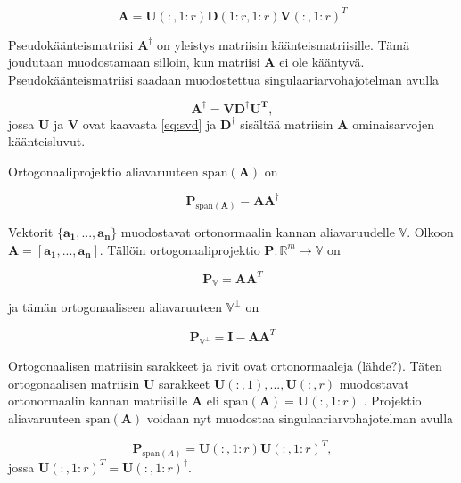 \begin{equation}
    \mathbf{A} = \mathbf{U}(:,1:r)\mathbf{D}(1:r,1:r)\mathbf{V}(:,1:r)^T
    \label{eq:2}
\end{equation}


Pseudokäänteismatriisi $\mathbf{A^{\dagger}}$ on yleistys matriisin käänteismatriisille. Tämä joudutaan muodostamaan silloin, kun matriisi $\mathbf{A}$ ei ole kääntyvä. Pseudokäänteismatriisi saadaan muodostettua singulaariarvohajotelman avulla

\begin{equation}
    \mathbf{A^{\dagger} = VD^{\dagger}U^T},
\end{equation}
jossa \textbf{U} ja \textbf{V} ovat kaavasta \ref{eq:svd} ja $\mathbf{D}^{\dagger}$ sisältää matriisin \textbf{A} ominaisarvojen käänteisluvut.

Ortogonaaliprojektio aliavaruuteen $\text{span}(\mathbf{A})$ on 

\begin{equation}
    \mathbf{P}_{\text{span}(\mathbf{A})}= \mathbf{AA}^{\dagger}
\end{equation}

Vektorit $\{\mathbf{a_1,...,a_n}\}$ muodostavat ortonormaalin kannan aliavaruudelle $\mathbb{V}$. Olkoon $\mathbf{A = [\mathbf{a_1,...,a_n}]}$. Tällöin ortogonaaliprojektio $\mathbf{P}: \mathbb{R}^m \to \mathbb{V}$ on

\begin{equation}
    \mathbf{P}_{\mathbb{V}} = \mathbf{AA}^T
\end{equation}

ja tämän ortogonaaliseen aliavaruuteen $\mathbb{V}^{\bot}$ on

\begin{equation}
    \mathbf{P}_{\mathbb{V}^{\bot}}=\mathbf{I}-\mathbf{AA}^T
\end{equation}

Ortogonaalisen matriisin sarakkeet ja rivit ovat ortonormaaleja (lähde?). Täten ortogonaalisen matriisin \textbf{U} sarakkeet $\mathbf{U}(:,1),...,\mathbf{U}(:,r)$ muodostavat ortonormaalin kannan matriisille \textbf{A} eli $\text{span}(\mathbf{A}) = \mathbf{U}(:,1:r)$ \citep{Uusitalo1997Signal-spaceComponents}. Projektio aliavaruuteen $\text{span}(\mathbf{A})$ voidaan nyt muodostaa singulaariarvohajotelman avulla

\begin{equation}
    \mathbf{P}_{\text{span}(A)} = \mathbf{U}(:,1:r)\mathbf{U}(:,1:r)^T,
    \label{eq:6}
\end{equation}
jossa $\mathbf{U}(:,1:r)^T = \mathbf{U}(:,1:r)^{\dagger}$.
